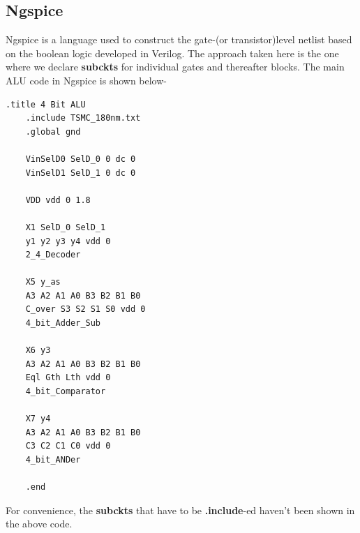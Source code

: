 \documentclass[a4paper, titlepage]{article}
\begin{document}
\subsection{Ngspice}
Ngspice is a language used to construct the gate-(or transistor)level netlist based on the boolean logic developed in
Verilog. The approach taken here is the one where we declare \textbf{subckts} for individual gates and thereafter blocks.
The main ALU code in Ngspice is shown below-
\begin{multicols}{2}
\setlength{\columnseprule}{0.4pt}
\begin{lstlisting}[language = SPICE]
    .title 4 Bit ALU
    .include TSMC_180nm.txt
    .global gnd
    
    VinSelD0 SelD_0 0 dc 0
    VinSelD1 SelD_1 0 dc 0
    
    VDD vdd 0 1.8
    
    X1 SelD_0 SelD_1 
    y1 y2 y3 y4 vdd 0 
    2_4_Decoder

    X5 y_as 
    A3 A2 A1 A0 B3 B2 B1 B0 
    C_over S3 S2 S1 S0 vdd 0 
    4_bit_Adder_Sub
    
    X6 y3 
    A3 A2 A1 A0 B3 B2 B1 B0 
    Eql Gth Lth vdd 0 
    4_bit_Comparator
    
    X7 y4 
    A3 A2 A1 A0 B3 B2 B1 B0 
    C3 C2 C1 C0 vdd 0 
    4_bit_ANDer
    
    .end
\end{lstlisting}
\end{multicols}
For convenience, the \textbf{subckts} that have to be \textbf{.include}-ed haven't been shown in the above code.
\end{document}
